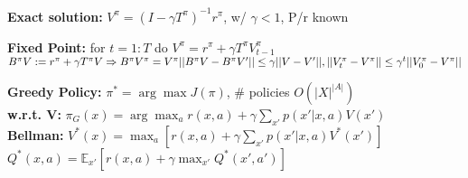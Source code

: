 \textbf{Exact solution:} $V^\pi = (I - \gamma T^\pi)^{-1} r^\pi$, w/ $\gamma < 1$, P/r known\\
\begin{comment}
	$V^\pi = \begin{pmatrix} V^\pi(1), \hdots, V^\pi(n) \end{pmatrix}$\\
$	r^\pi = \begin{pmatrix} r^\pi(1, \pi(1)), \hdots, r^\pi(n, \pi(n)) \end{pmatrix}$\\
	$T^\pi = \begin{pmatrix}
 		p(1|1,\pi(1)) & \cdots & p(n|1,\pi(1))\\
 		\vdots & \ddots & \vdots\\
 		p(1|n,\pi(n)) & \cdots & p(n|n,\pi(n))\\
 	\end{pmatrix}$\\
\end{comment}

\textbf{Fixed Point:} for $t=1:T$ do $V^\pi = r^\pi + \gamma T^\pi V^\pi_{t-1}$\\
$B^\pi V := r^\pi + \gamma T^\pi V \Rightarrow B^\pi V^\pi = V^\pi \\
||B^\pi V - B^\pi V'|| \leq \gamma ||V - V'||,
||V^\pi_t - V^\pi|| \leq \gamma^t|| V_0^\pi - V^\pi||$
\begin{comment}
	With the contraction B, an upper bound can be derived in terms of $\gamma$ and the value function. 
	Considering the true Value function $V^\pi$, we see that each iteration is reducing the error exponentially.\\
\end{comment}

\textbf{Greedy Policy:} $\pi^* = \arg\max J(\pi)$, \# policies $O(|X|^{|A|})$\\
\textbf{w.r.t. V:} $\pi_G(x) = \arg \max_a r(x,a) + \gamma \sum_{x'} p(x'|x,a) V(x')$\\
\textbf{Bellman:} $V^*(x) = \max_a[r(x,a) + \gamma \sum_{x'} p(x'| x,a) V^*(x')]$\\
$Q^*(x,a) = \mathbb{E}_{x'}[r(x,a) + \gamma \max_{x'} Q^*(x', a')]$\\
\begin{comment}
	Every value function induces a policy, every policy induces a value function.\\
	\textbf{Bellman Theorem:} The optimal policy is greedy w.r.t. to its induced value function.\\
\end{comment}

